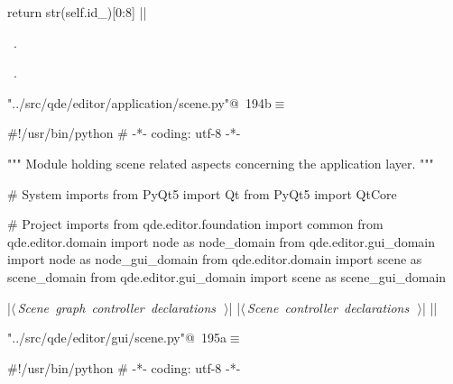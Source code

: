 \documentclass[%
    a4paper,    %
    justified,  %
    nobib,      %
    openany     %
]{tufte-book}
\makeatletter
\renewcommand{\label}[1]{\@tufte@label{##1}}%
\makeatother
\begin{document}
\begin{fullwidth}
\begin{flushleft}
\begin{minipage}{\linewidth}
\begin{pythoncode}
    return str(self.id_)[0:8]
|\NWsep|
\end{pythoncode}
\vspace{1.5ex}
\footnotesize
\begin{list}{}{\setlength{\itemsep}{-\parsep}\setlength{\itemindent}{-\leftmargin}}
\item \NWtxtMacroDefBy\ .
\item \NWtxtMacroRefIn\ .

\item{}
\end{list}
\end{minipage}\vspace{4ex}
\end{flushleft}
\begin{flushleft} \small
\begin{minipage}{\linewidth}\label{scrap182}\raggedright\small
{} \verb@"../src/qde/editor/application/scene.py"@\nobreak\ {\footnotesize {194b}}$\equiv$
\vspace{-1ex}
\begin{pythoncode}
#!/usr/bin/python
# -*- coding: utf-8 -*-

""" Module holding scene related aspects concerning the application layer.
"""

# System imports
from PyQt5 import Qt
from PyQt5 import QtCore

# Project imports
from qde.editor.foundation import common
from qde.editor.domain     import node  as node_domain
from qde.editor.gui_domain import node  as node_gui_domain
from qde.editor.domain     import scene as scene_domain
from qde.editor.gui_domain import scene as scene_gui_domain

|\hbox{$\langle\,${\itshape Scene graph controller declarations}\nobreak\ {\footnotesize {}}$\,\rangle$}|
|\hbox{$\langle\,${\itshape Scene controller declarations}\nobreak\ {\footnotesize {}}$\,\rangle$}|
|\NWsep|
\end{pythoncode}
\vspace{1.5ex}
\footnotesize
\begin{list}{}{\setlength{\itemsep}{-\parsep}\setlength{\itemindent}{-\leftmargin}}

\item{}
\end{list}
\end{minipage}\vspace{4ex}
\end{flushleft}
\begin{flushleft} \small
\begin{minipage}{\linewidth}\label{scrap183}\raggedright\small
{} \verb@"../src/qde/editor/gui/scene.py"@\nobreak\ {\footnotesize {195a}}$\equiv$
\vspace{-1ex}
\begin{pythoncode}
#!/usr/bin/python
# -*- coding: utf-8 -*-


\end{pythoncode}
\end{minipage}
\end{flushleft}
\end{fullwidth}
\end{document}
